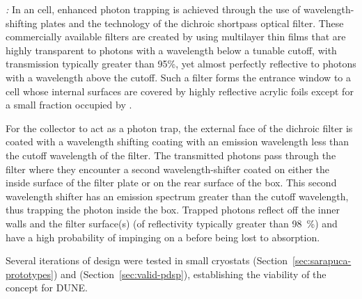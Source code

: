 \textit{:} In an  cell, enhanced photon trapping is achieved through the
use of wavelength-shifting plates and the technology of the dichroic shortpass optical filter. These commercially available filters are created by using multilayer thin films that are highly transparent to photons with a wavelength below a tunable cutoff, 
with transmission typically greater than 95\%, yet almost perfectly reflective to photons with a wavelength above the cutoff.  Such a filter forms the entrance window to a cell whose internal surfaces are covered by highly reflective acrylic foils
except for a small fraction occupied by .

For the collector to act as a photon trap, the external face of the dichroic filter is coated with a wavelength shifting coating with an emission wavelength less than the cutoff wavelength of the filter. 
The transmitted photons pass through the filter where they encounter a second wavelength-shifter coated on either the inside surface of the filter plate or on the rear surface of the box.
This second wavelength shifter has an emission spectrum greater than the cutoff wavelength, thus trapping the photon inside the box.
Trapped photons reflect off the inner walls and the filter surface(s) (of reflectivity typically greater than \SI{98}{\%}) 
and have a high probability of impinging on a  before being lost to absorption. 


Several iterations of  design were tested in small cryostats (Section~\ref{sec:sarapuca-prototypes}) and  (Section~\ref{sec:valid-pdsp}), establishing the viability of the concept for DUNE.

